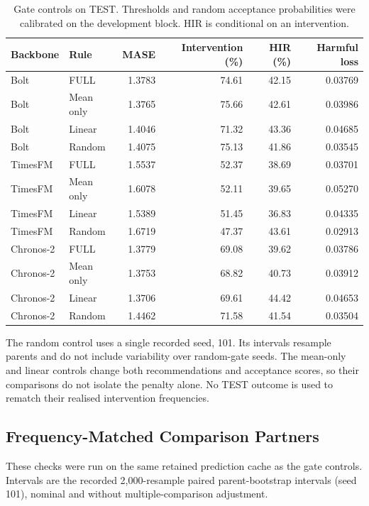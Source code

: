 \documentclass{article}
\begin{document}
\begin{table}[htbp]
\centering\small
\caption{Gate controls on TEST. Thresholds and random acceptance probabilities were
calibrated on the development block. HIR is conditional on an intervention.}
\label{tab:v52-gates}
\begin{tabular}{llrrrr}
\toprule
Backbone & Rule & MASE & Intervention (\%) & HIR (\%) & Harmful loss \\
\midrule
Bolt & FULL & 1.3783 & 74.61 & 42.15 & 0.03769 \\
Bolt & Mean only & 1.3765 & 75.66 & 42.61 & 0.03986 \\
Bolt & Linear & 1.4046 & 71.32 & 43.36 & 0.04685 \\
Bolt & Random & 1.4075 & 75.13 & 41.86 & 0.03545 \\
TimesFM & FULL & 1.5537 & 52.37 & 38.69 & 0.03701 \\
TimesFM & Mean only & 1.6078 & 52.11 & 39.65 & 0.05270 \\
TimesFM & Linear & 1.5389 & 51.45 & 36.83 & 0.04335 \\
TimesFM & Random & 1.6719 & 47.37 & 43.61 & 0.02913 \\
Chronos-2 & FULL & 1.3779 & 69.08 & 39.62 & 0.03786 \\
Chronos-2 & Mean only & 1.3753 & 68.82 & 40.73 & 0.03912 \\
Chronos-2 & Linear & 1.3706 & 69.61 & 44.42 & 0.04653 \\
Chronos-2 & Random & 1.4462 & 71.58 & 41.54 & 0.03504 \\
\bottomrule
\end{tabular}
\end{table}

The random control uses a single recorded seed, 101. Its intervals resample parents and
do not include variability over random-gate seeds. The mean-only and linear controls change
both recommendations and acceptance scores, so their comparisons do not isolate the penalty
alone. No TEST outcome is used to rematch their realised intervention frequencies.

\subsection{Frequency-Matched Comparison Partners}
\label{app:matched-partners}
These checks were run on the same retained prediction cache as the gate controls.
Intervals are the recorded 2,000-resample paired parent-bootstrap intervals (seed 101),
nominal and without multiple-comparison adjustment.
\end{document}
